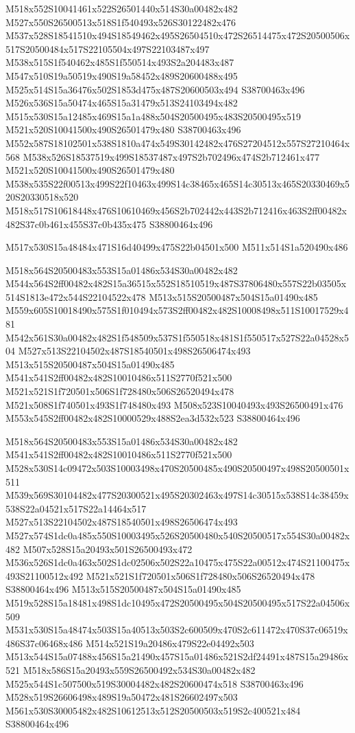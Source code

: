 \documentclass{article}
\begin{document}
\begin{multicols}{2}
M518x552S10041461x522S26501440x514S30a00482x482 M527x550S26500513x518S1f540493x526S30122482x476 M537x528S18541510x494S18549462x495S26504510x472S26514475x472S20500506x517S20500484x517S22105504x497S22103487x497 M538x515S1f540462x485S1f550514x493S2a204483x487 M547x510S19a50519x490S19a58452x489S20600488x495 M525x514S15a36476x502S1853d475x487S20600503x494 S38700463x496 M526x536S15a50474x465S15a31479x513S24103494x482 M515x530S15a12485x469S15a1a488x504S20500495x483S20500495x519 M521x520S10041500x490S26501479x480 S38700463x496 M552x587S18102501x538S1810a474x549S30142482x476S27204512x557S27210464x568 M538x526S18537519x499S18537487x497S2b702496x474S2b712461x477 M521x520S10041500x490S26501479x480 M538x535S22f00513x499S22f10463x499S14c38465x465S14c30513x465S20330469x520S20330518x520 M518x517S10618448x476S10610469x456S2b702442x443S2b712416x463S2ff00482x482S37c0b461x455S37c0b435x475 S38800464x496

\begin{center}
M517x530S15a48484x471S16d40499x475S22b04501x500 M511x514S1a520490x486 
\end{center}


M518x564S20500483x553S15a01486x534S30a00482x482 M544x564S2ff00482x482S15a36515x552S18510519x487S37806480x557S22b03505x514S1813e472x544S22104522x478 M513x515S20500487x504S15a01490x485 M559x605S10018490x575S1f010494x573S2ff00482x482S10008498x511S10017529x481 M542x561S30a00482x482S1f548509x537S1f550518x481S1f550517x527S22a04528x504 M527x513S22104502x487S18540501x498S26506474x493 M513x515S20500487x504S15a01490x485 M541x541S2ff00482x482S10010486x511S2770f521x500 M521x521S1f720501x506S1f728480x506S26520494x478 M521x508S1f740501x493S1f748480x493 M508x523S10040493x493S26500491x476 M553x545S2ff00482x482S10000529x488S2ea3d532x523 S38800464x496

M518x564S20500483x553S15a01486x534S30a00482x482 M541x541S2ff00482x482S10010486x511S2770f521x500 M528x530S14c09472x503S10003498x470S20500485x490S20500497x498S20500501x511 M539x569S30104482x477S20300521x495S20302463x497S14c30515x538S14c38459x538S22a04521x517S22a14464x517 M527x513S22104502x487S18540501x498S26506474x493 M527x574S1dc0a485x550S10003495x526S20500480x540S20500517x554S30a00482x482 M507x528S15a20493x501S26500493x472 M536x526S1dc0a463x502S1dc02506x502S22a10475x475S22a00512x474S21100475x493S21100512x492 M521x521S1f720501x506S1f728480x506S26520494x478 S38800464x496 M513x515S20500487x504S15a01490x485 M519x528S15a18481x498S1dc10495x472S20500495x504S20500495x517S22a04506x509 M531x530S15a48474x503S15a40513x503S2c600509x470S2c611472x470S37c06519x486S37c06468x486 M514x521S19a20486x479S22e04492x503 M513x544S15a07488x456S15a21490x457S15a01486x521S2df24491x487S15a29486x521 M518x586S15a20493x559S26500492x534S30a00482x482 M525x544S1c507500x519S30004482x482S20600474x518 S38700463x496 M528x519S26606498x489S19a50472x481S26602497x503 M561x530S30005482x482S10612513x512S20500503x519S2c400521x484 S38800464x496


\end{multicols}
\end{document}
